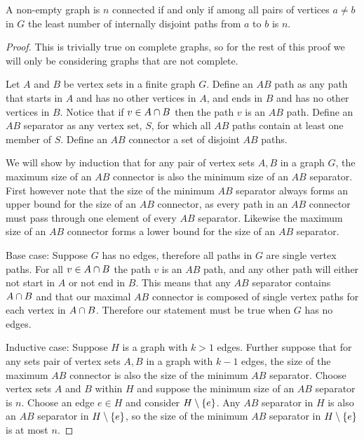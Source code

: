 \documentclass{article}
\begin{document}
\begin{theorem}\label{menger}
	A non-empty graph is $n$ connected if and only if among all pairs of vertices $a\not=b$ in $G$ the least number of internally disjoint paths from $a$ to $b$ is $n$.
\end{theorem}
\begin{proof}
	This is trivially true on complete graphs, so for the rest of this proof we will only be considering graphs that are not complete.
	
	Let $A$ and $B$ be vertex sets in a finite graph $G$. Define an $AB$ path as any path that starts in $A$ and has no other vertices in $A$, and ends in $B$ and has no other vertices in $B$. Notice that if $v\in A\cap B$ then the path $v$ is an $AB$ path. Define an $AB$ separator as any vertex set, $S$, for which all $AB$ paths contain at least one member of $S$. Define an $AB$ connector a set of disjoint $AB$ paths.
	
	We will show by induction that for any pair of vertex sets $A,B$ in a graph $G$, the maximum size of an $AB$ connector is also the minimum size of an $AB$ separator. First however note that the size of the minimum $AB$ separator always forms an upper bound for the size of an $AB$ connector, as every path in an $AB$ connector must pass through one element of every $AB$ separator. Likewise the maximum size of an $AB$ connector forms a lower bound for the size of an $AB$ separator. 
	
	Base case: Suppose $G$ has no edges, therefore all paths in $G$ are single vertex paths. For all $v \in A \cap B$ the path $v$ is an $AB$ path, and any other path will either not start in $A$ or not end in $B$. This means that any $AB$ separator contains $A\cap B$ and that our maximal $AB$ connector is composed of single vertex paths for each vertex in $A\cap B$. Therefore our statement must be true when $G$ has no edges.
	
	Inductive case: Suppose $H$ is a graph with $k>1$ edges. Further suppose that for any sets pair of vertex sets $A,B$ in a graph with $k-1$ edges, the size of the maximum $AB$ connector is also the size of the minimum $AB$ separator. Choose vertex sets $A$ and $B$ within $H$ and suppose the minimum size of an $AB$ separator is $n$. Choose an edge $e \in H$ and consider $H\setminus\left\{ {e} \right\}$. Any $AB$ separator in $H$ is also an $AB$ separator in $H\setminus\left\{ {e} \right\}$, so the size of the minimum $AB$ separator in $H\setminus\left\{ {e} \right\}$ is at most $n$.
	

\end{proof}
\end{document}
